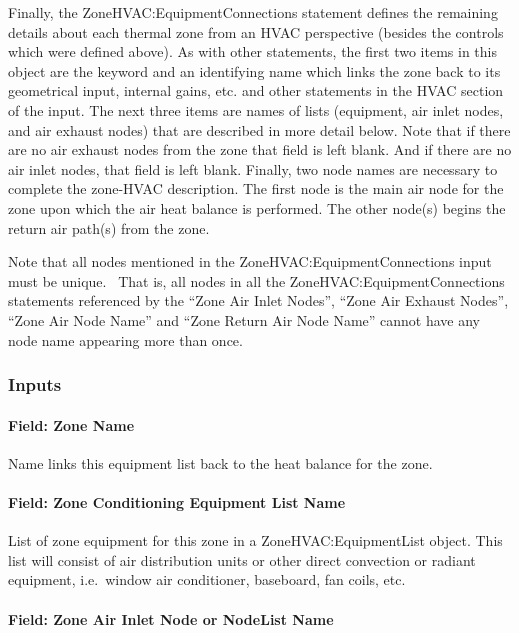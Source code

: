 Finally, the ZoneHVAC:EquipmentConnections statement defines the remaining details about each thermal zone from an HVAC perspective (besides the controls which were defined above). As with other statements, the first two items in this object are the keyword and an identifying name which links the zone back to its geometrical input, internal gains, etc. and other statements in the HVAC section of the input. The next three items are names of lists (equipment, air inlet nodes, and air exhaust nodes) that are described in more detail below. Note that if there are no air exhaust nodes from the zone that field is left blank. And if there are no air inlet nodes, that field is left blank. Finally, two node names are necessary to complete the zone-HVAC description. The first node is the main air node for the zone upon which the air heat balance is performed. The other node(s) begins the return air path(s) from the zone.

Note that all nodes mentioned in the ZoneHVAC:EquipmentConnections input must be unique.~ That is, all nodes in all the ZoneHVAC:EquipmentConnections statements referenced by the ``Zone Air Inlet Nodes'', ``Zone Air Exhaust Nodes'', ``Zone Air Node Name'' and ``Zone Return Air Node Name'' cannot have any node name appearing more than once.

\subsubsection{Inputs}\label{inputs-1-052}

\paragraph{Field: Zone Name}\label{field-zone-name-015}

Name links this equipment list back to the heat balance for the zone.

\paragraph{Field: Zone Conditioning Equipment List Name}\label{field-zone-conditioning-equipment-list-name}

List of zone equipment for this zone in a ZoneHVAC:EquipmentList object. This list will consist of air distribution units or other direct convection or radiant equipment, i.e.~window air conditioner, baseboard, fan coils, etc.

\paragraph{Field: Zone Air Inlet Node or NodeList Name}\label{field-zone-air-inlet-node-or-nodelist-name}

